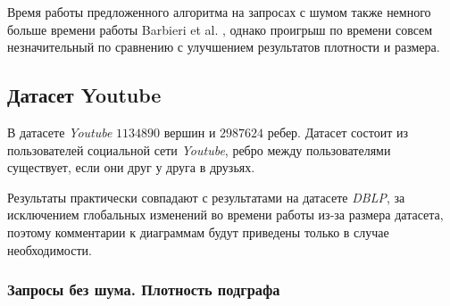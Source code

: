   \begin{center}
  \end{center}

Время работы предложенного алгоритма на запросах с шумом также немного больше времени работы Barbieri et al. \cite{Barbieri15}, однако проигрыш по времени совсем незначительный по сравнению с улучшением результатов плотности и размера.

\subsection{Датасет Youtube}

В датасете \textit{Youtube} $1134890$ вершин и $2987624$ ребер. Датасет состоит из пользователей социальной сети \textit{Youtube}, ребро между пользователями существует, если они друг у друга в друзьях.

Результаты практически совпадают с результатами на датасете \textit{DBLP}, за исключением глобальных изменений во времени работы из-за размера датасета, поэтому комментарии к диаграммам будут приведены только в случае необходимости.

\subsubsection{Запросы без шума. Плотность подграфа}


